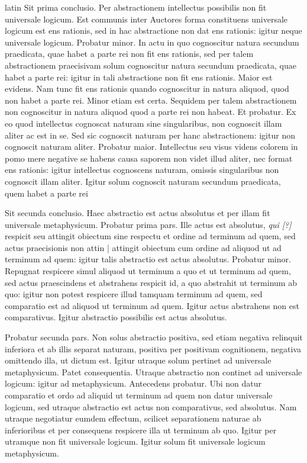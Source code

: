 \begin{otherlanguage*}{latin}
\pstart
  Sit prima conclusio. Per abstractionem intellectus possibilis non fit universale logicum. Est communis inter Auctores forma constituens universale logicum est ens rationis, sed in hac abstractione non dat ens rationis: igitur neque universale logicum. Probatur minor. In actu in quo cognoscitur natura secundum praedicata, quae habet a parte rei non fit ens rationis, sed per talem abstractionem praecisivam solum cognoscitur natura secundum praedicata, quae habet a parte rei: igitur in tali abstractione non fit ens rationis. Maior est evidens. Nam tunc fit ens rationis quando cognoscitur in natura aliquod, quod non habet a parte rei. Minor etiam est certa. Sequidem per talem abstractionem non cognoscitur in natura aliquod quod a parte rei non habeat. Et probatur. Ex eo quod intellectus cognoscat naturam sine singularibus, non cognoscit illam aliter ac est in se. Sed sic cognoscit naturam per hanc abstractionem: igitur non cognoscit naturam aliter. Probatur maior. Intellectus seu visus videns colorem in pomo mere negative se habens causa saporem non videt illud aliter, nec format ens rationis: igitur intellectus cognoscens naturam, omissis singularibus non cognoscit illam aliter. Igitur solum cognoscit naturam secundum praedicata, quem habet a parte rei 
\pend

\pstart
  Sit secunda conclusio. Haec abstractio est actus absolutus et per illam fit universale metaphysicum. Probatur prima pars. Ille actus est absolutus, \emph{qui [?]} respicit seu attingit obiectum sine respectu et ordine ad terminum ad quem, sed actus praecisionis non attin \textnormal{|}    attingit obiectum cum ordine ad aliquod ut ad terminum ad quem: igitur talis abstractio est actus absolutus. Probatur minor. Repugnat respicere simul aliquod ut terminum a quo et ut terminum ad quem, sed actus praescindens et abstrahens respicit id, a quo abstrahit ut terminum ab quo: igitur non potest respicere illud tamquam terminum ad quem, sed comparatio est ad aliquod ut terminum ad quem. Igitur actus abstrahens non est comparativus. Igitur abstractio possibilis est actus absolutus. 
\pend

\pstart
  Probatur secunda pars. Non solus abstractio positiva, sed etiam negativa relinquit inferiora et ab illis separat naturam, positiva per positivam cognitionem, negativa omittendo illa, ut dictum est. Igitur utraque solum pertinet ad universale metaphysicum. Patet consequentia. Utraque abstractio non continet ad universale logicum: igitur ad metaphysicum. Antecedens probatur. Ubi non datur comparatio et ordo ad aliquid ut terminum ad quem non datur universale logicum, sed utraque abstractio est actus non comparativus, sed absolutus. Nam utraque negotiatur eumdem effectum, scilicet separationem naturae ab inferioribus et per consequens respicere illa ut terminum ab quo. Igitur per utramque non fit universale logicum. Igitur solum fit universale logicum metaphysicum. 
\pend


\end{otherlanguage*}
